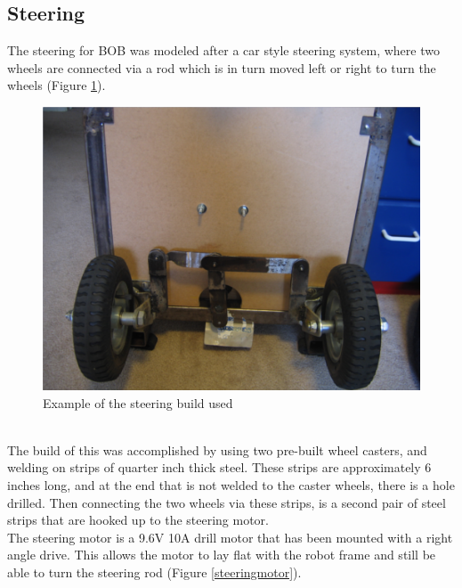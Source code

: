 \documentclass{article}
\begin{document}
\subsection{Steering}
The steering for BOB was modeled after a car style steering system, where two wheels are connected via a rod which is in turn moved left or right to turn the wheels (Figure \ref{steering}).
\begin{figure}[htp]
  \begin{center}
\includegraphics[scale=0.25]{steering}
  \end{center}
  \caption{Example of the steering build used}
\label{steering}
\end{figure}\\
The build of this was accomplished by using two pre-built wheel casters, and welding on strips of quarter inch thick steel. These strips are approximately 6 inches long, and at the end that is not welded to the caster wheels, there is a hole drilled. Then connecting the two wheels via these strips, is a second pair of steel strips that are hooked up to the steering motor.\\
The steering motor is a 9.6V 10A drill motor that has been mounted with a right angle drive. This allows the motor to lay flat with the robot frame and still be able to turn the steering rod (Figure \ref{steeringmotor}).
\end{document}
